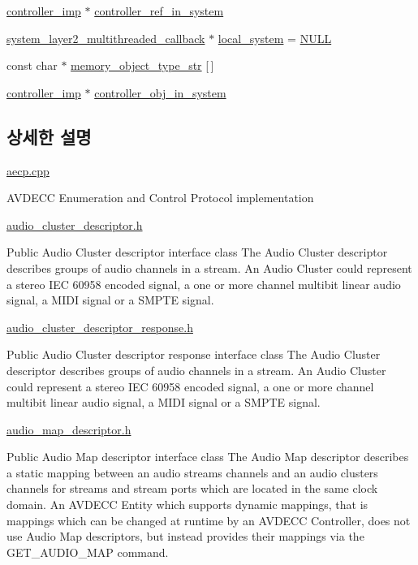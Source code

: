 \begin{DoxyCompactItemize}
\item 
\hyperlink{classavdecc__lib_1_1controller__imp}{controller\+\_\+imp} $\ast$ \hyperlink{namespaceavdecc__lib_a8f621b84ee2ae87ab9a54ca441e21f9b}{controller\+\_\+ref\+\_\+in\+\_\+system}
\item 
\hyperlink{classavdecc__lib_1_1system__layer2__multithreaded__callback}{system\+\_\+layer2\+\_\+multithreaded\+\_\+callback} $\ast$ \hyperlink{namespaceavdecc__lib_ac8524539181fa62deed358df4dcf507c}{local\+\_\+system} = \hyperlink{openavb__types__base__pub_8h_a070d2ce7b6bb7e5c05602aa8c308d0c4}{N\+U\+LL}
\item 
const char $\ast$ \hyperlink{namespaceavdecc__lib_a46dd51611fc0c91e9fa3943bf87024f7}{memory\+\_\+object\+\_\+type\+\_\+str} \mbox{[}$\,$\mbox{]}
\item 
\hyperlink{classavdecc__lib_1_1controller__imp}{controller\+\_\+imp} $\ast$ \hyperlink{namespaceavdecc__lib_aa57af65842215e8122158a5fd2e31718}{controller\+\_\+obj\+\_\+in\+\_\+system}
\end{DoxyCompactItemize}


\subsection{상세한 설명}
\hyperlink{aecp_8cpp}{aecp.\+cpp}

A\+V\+D\+E\+CC Enumeration and Control Protocol implementation

\hyperlink{audio__cluster__descriptor_8h}{audio\+\_\+cluster\+\_\+descriptor.\+h}

Public Audio Cluster descriptor interface class The Audio Cluster descriptor describes groups of audio channels in a stream. An Audio Cluster could represent a stereo I\+EC 60958 encoded signal, a one or more channel multibit linear audio signal, a M\+I\+DI signal or a S\+M\+P\+TE signal.

\hyperlink{audio__cluster__descriptor__response_8h}{audio\+\_\+cluster\+\_\+descriptor\+\_\+response.\+h}

Public Audio Cluster descriptor response interface class The Audio Cluster descriptor describes groups of audio channels in a stream. An Audio Cluster could represent a stereo I\+EC 60958 encoded signal, a one or more channel multibit linear audio signal, a M\+I\+DI signal or a S\+M\+P\+TE signal.

\hyperlink{audio__map__descriptor_8h}{audio\+\_\+map\+\_\+descriptor.\+h}

Public Audio Map descriptor interface class The Audio Map descriptor describes a static mapping between an audio stream\textquotesingle{}s channels and an audio cluster\textquotesingle{}s channels for streams and stream ports which are located in the same clock domain. An A\+V\+D\+E\+CC Entity which supports dynamic mappings, that is mappings which can be changed at runtime by an A\+V\+D\+E\+CC Controller, does not use Audio Map descriptors, but instead provides their mappings via the G\+E\+T\+\_\+\+A\+U\+D\+I\+O\+\_\+\+M\+AP command.

